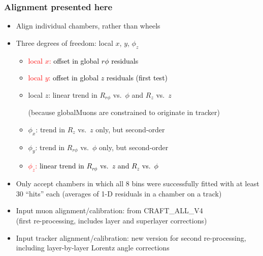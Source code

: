 \documentclass[compress]{beamer}
\begin{document}
\begin{frame}
\frametitle{Alignment presented here}

\begin{itemize}
\item Align individual chambers, rather than wheels

\item Three degrees of freedom: local $x$, $y$, $\phi_z$

\begin{itemize}\setlength{\itemsep}{0.1 cm}
\item<1-| alert@1> \textcolor{red}{local $x$:} \textcolor{black}{offset in global $r\phi$ residuals}
\item<1-| alert@1> \textcolor{red}{local $y$:} \textcolor{black}{offset in global $z$ residuals (first test)}
\item local $z$: linear trend in $R_{r\phi}$ vs.\ $\phi$ and $R_{z}$
  vs.\ $z$

(because globalMuons are constrained to originate in tracker)
\item $\phi_x$: trend in $R_{z}$ vs.\ $z$ only, but second-order
\item $\phi_y$: trend in $R_{r\phi}$ vs.\ $\phi$ only, but second-order
\item<1-| alert@1> \textcolor{red}{$\phi_z$:} \textcolor{black}{linear trend in $R_{r\phi}$ vs.\ $z$ and $R_{z}$ vs.\ $\phi$}
\end{itemize}

\item Only accept chambers in which all 8 bins were successfully fitted with at least 30 ``hits'' each (averages of 1-D residuals in a chamber on a track)

\item Input muon alignment/calibration: from CRAFT\_ALL\_V4 \\ (first re-processing, includes layer and superlayer corrections)

\item Input tracker alignment/calibration: new version for second re-processing, including layer-by-layer Lorentz angle corrections
\end{itemize}
\end{frame}
\end{document}
